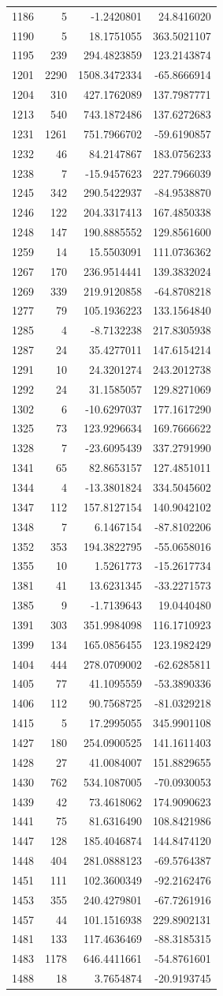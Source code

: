 \documentclass[
]{article}
\begin{document}
\begin{longtable}[]{@{}lrrr@{}}
1186 & 5 & -1.2420801 & 24.8416020\tabularnewline
1190 & 5 & 18.1751055 & 363.5021107\tabularnewline
1195 & 239 & 294.4823859 & 123.2143874\tabularnewline
1201 & 2290 & 1508.3472334 & -65.8666914\tabularnewline
1204 & 310 & 427.1762089 & 137.7987771\tabularnewline
1213 & 540 & 743.1872486 & 137.6272683\tabularnewline
1231 & 1261 & 751.7966702 & -59.6190857\tabularnewline
1232 & 46 & 84.2147867 & 183.0756233\tabularnewline
1238 & 7 & -15.9457623 & 227.7966039\tabularnewline
1245 & 342 & 290.5422937 & -84.9538870\tabularnewline
1246 & 122 & 204.3317413 & 167.4850338\tabularnewline
1248 & 147 & 190.8885552 & 129.8561600\tabularnewline
1259 & 14 & 15.5503091 & 111.0736362\tabularnewline
1267 & 170 & 236.9514441 & 139.3832024\tabularnewline
1269 & 339 & 219.9120858 & -64.8708218\tabularnewline
1277 & 79 & 105.1936223 & 133.1564840\tabularnewline
1285 & 4 & -8.7132238 & 217.8305938\tabularnewline
1287 & 24 & 35.4277011 & 147.6154214\tabularnewline
1291 & 10 & 24.3201274 & 243.2012738\tabularnewline
1292 & 24 & 31.1585057 & 129.8271069\tabularnewline
1302 & 6 & -10.6297037 & 177.1617290\tabularnewline
1325 & 73 & 123.9296634 & 169.7666622\tabularnewline
1328 & 7 & -23.6095439 & 337.2791990\tabularnewline
1341 & 65 & 82.8653157 & 127.4851011\tabularnewline
1344 & 4 & -13.3801824 & 334.5045602\tabularnewline
1347 & 112 & 157.8127154 & 140.9042102\tabularnewline
1348 & 7 & 6.1467154 & -87.8102206\tabularnewline
1352 & 353 & 194.3822795 & -55.0658016\tabularnewline
1355 & 10 & 1.5261773 & -15.2617734\tabularnewline
1381 & 41 & 13.6231345 & -33.2271573\tabularnewline
1385 & 9 & -1.7139643 & 19.0440480\tabularnewline
1391 & 303 & 351.9984098 & 116.1710923\tabularnewline
1399 & 134 & 165.0856455 & 123.1982429\tabularnewline
1404 & 444 & 278.0709002 & -62.6285811\tabularnewline
1405 & 77 & 41.1095559 & -53.3890336\tabularnewline
1406 & 112 & 90.7568725 & -81.0329218\tabularnewline
1415 & 5 & 17.2995055 & 345.9901108\tabularnewline
1427 & 180 & 254.0900525 & 141.1611403\tabularnewline
1428 & 27 & 41.0084007 & 151.8829655\tabularnewline
1430 & 762 & 534.1087005 & -70.0930053\tabularnewline
1439 & 42 & 73.4618062 & 174.9090623\tabularnewline
1441 & 75 & 81.6316490 & 108.8421986\tabularnewline
1447 & 128 & 185.4046874 & 144.8474120\tabularnewline
1448 & 404 & 281.0888123 & -69.5764387\tabularnewline
1451 & 111 & 102.3600349 & -92.2162476\tabularnewline
1453 & 355 & 240.4279801 & -67.7261916\tabularnewline
1457 & 44 & 101.1516938 & 229.8902131\tabularnewline
1481 & 133 & 117.4636469 & -88.3185315\tabularnewline
1483 & 1178 & 646.4411661 & -54.8761601\tabularnewline
1488 & 18 & 3.7654874 & -20.9193745\tabularnewline

\end{longtable}
\end{document}

